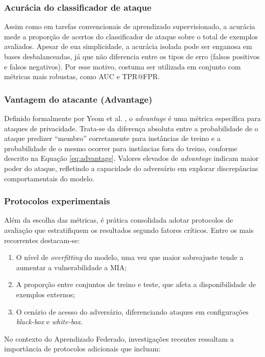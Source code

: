 \documentclass[
	12pt,				%
	openright,			%
	oneside,			%
	a4paper,			%
	english,			%
	french,				%
	spanish,			%
	brazil,				%
	]{abntex2}
\begin{document}
\subsubsection{\textbf{Acurácia do classificador de ataque}}
Assim como em tarefas convencionais de aprendizado supervisionado, a acurácia mede a proporção de acertos do classificador de ataque sobre o total de exemplos avaliados. Apesar de sua simplicidade, a acurácia isolada pode ser enganosa em bases desbalanceadas, já que não diferencia entre os tipos de erro (falsos positivos e falsos negativos). Por esse motivo, costuma ser utilizada em conjunto com métricas mais robustas, como AUC e TPR@FPR.

\subsubsection{\textbf{Vantagem do atacante (Advantage)}}
Definido formalmente por Yeom et al. \cite{yeom2018privacyrisk}, o \textit{advantage} é uma métrica específica para ataques de privacidade. Trata-se da diferença absoluta entre a probabilidade de o ataque predizer “membro” corretamente para instâncias de treino e a probabilidade de o mesmo ocorrer para instâncias fora do treino, conforme descrito na Equação \ref{eq:advantage}. Valores elevados de \textit{advantage} indicam maior poder do ataque, refletindo a capacidade do adversário em explorar discrepâncias comportamentais do modelo.

\subsubsection{\textbf{Protocolos experimentais}}
Além da escolha das métricas, é prática consolidada adotar protocolos de avaliação que estratifiquem os resultados segundo fatores críticos. Entre os mais recorrentes destacam-se:


\begin{enumerate}[label=(\roman*)]
    \item O nível de \textit{overfitting} do modelo, uma vez que maior sobreajuste tende a aumentar a vulnerabilidade a MIA;
    \item A proporção entre conjuntos de treino e teste, que afeta a disponibilidade de exemplos externos;
    \item O cenário de acesso do adversário, diferenciando ataques em configurações \textit{black-box} e \textit{white-box}.
\end{enumerate}

No contexto do Aprendizado Federado, investigações recentes ressaltam a importância de protocolos adicionais que incluam:
\end{document}
